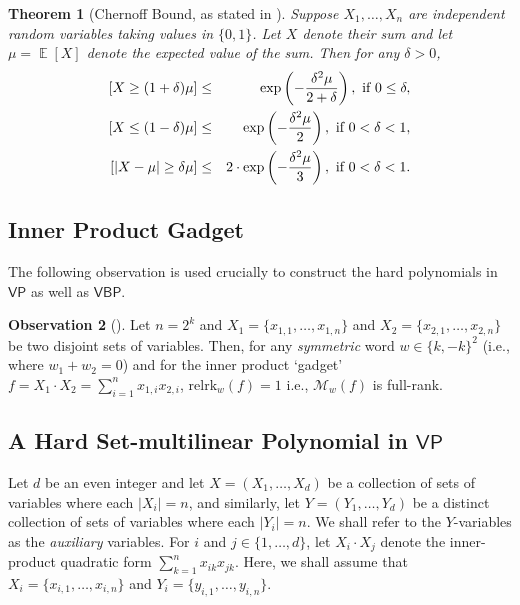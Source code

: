 \documentclass[10pt,a4paper]{article}
\newtheorem{theorem}{Theorem}[section]
\theoremstyle{definition}%
\newtheorem{obs}[theorem]{Observation}
\theoremstyle{plain}
\DeclareMathOperator*{\E}{\mathbb{E}}
\let\Pr\relax
\DeclareMathOperator*{\Pr}{\mathbb{P}}
\newcommand{\rk}{\mathrm{relrk}}
\newcommand{\VP}{\mathsf{VP}}
\newcommand{\VBP}{\mathsf{VBP}}
\newcommand{\zo}{\{0,1\}}
\newcommand{\sumi}{\sum_{i=1}^n}
\newcommand{\calM}{\mathcal{M}}
\begin{document}
\begin{theorem}[Chernoff Bound, as stated in \cite{mitzenmacher_upfal_2005}]\label{thm:Chernoff}
Suppose $X_1, \ldots, X_n$ are independent random variables taking values in $\zo$. Let $X$ denote their sum and let $\mu = \E[X]$ denote the expected value of the sum. Then for any $\delta > 0$,
\begin{eqnarray*} \Pr[X\ge (1+\delta)\mu] &\le& \exp\left(-\frac{\delta^2\mu}{2+\delta}\right), \text{ if }0\leq \delta, \\
  \Pr[X\le (1-\delta)\mu] &\le& \exp\left(-\frac{\delta^2\mu}{2}\right), \text{ if }0< \delta <1, \\ 
  \Pr[|X-\mu|\geq \delta \mu]&\leq& 2\cdot \exp\left(-\frac{\delta^2\mu}{3}\right),\text{ if }0< \delta <1.\\
\end{eqnarray*}
\end{theorem}

\subsection{Inner Product Gadget}
The following observation is used crucially to construct the hard polynomials in $\VP$ as well as $\VBP$. 
\begin{obs}[\cite{KushS23}]\label{obs:ip-full-rank}
    Let $n = 2^k$ and $X_1 = \{x_{1,1},\ldots,x_{1,n}\}$ and $X_2 = \{x_{2,1},\ldots,x_{2,n}\}$ be two disjoint sets of variables. Then, for any \emph{symmetric} word $w\in\{k,-k\}^2$ (i.e., where $w_1 + w_2 = 0$) and for the inner product `gadget' $ f = X_1\cdot X_2 = \sumi x_{1,i}x_{2,i}$, $\rk_w(f) = 1$ i.e., $\calM_w(f)$ is full-rank.
\end{obs}


\subsection{A Hard Set-multilinear Polynomial in $\VP$}\label{sec:VP}
Let $d$ be an even integer and let $X = (X_1,\ldots, X_{d})$ be a collection of sets of variables where each $|X_i| = n$, and similarly, let $Y = (Y_1,\ldots, Y_{d})$ be a distinct collection of sets of variables where each $|Y_i| = n$. We shall refer to the $Y$-variables as the \emph{auxiliary} variables. For $i$ and $j \in \{1,\ldots,d\}$, let $X_i \cdot X_j$ denote the inner-product quadratic form $\sum_{k = 1}^n x_{ik}x_{jk}$. Here, we shall assume that $X_i = \{x_{i,1},\ldots, x_{i,n}\}$ and $Y_i = \{y_{i,1},\ldots, y_{i,n}\}$.
\end{document}
